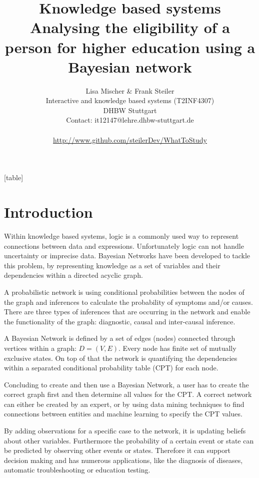 \documentclass[%
	pdftex,
	oneside,        %
	11pt,           %
	parskip=half,   %
	headsepline,    %
	footsepline,    %
	abstracton,     %
	USenglish,      %
	a4paper,        %
]{report}
\title{Knowledge based systems\\ Analysing the eligibility of a person for higher education using a Bayesian network}
\author{Lisa Mischer \& Frank Steiler\\ Interactive and knowledge based systems (T2INF4307)\\ DHBW Stuttgart\\ Contact: it12147@lehre.dhbw-stuttgart.de\\\\ \url{http://www.github.com/steilerDev/WhatToStudy}}
\begin{document}

[table]

\maketitle

\newpage
\thispagestyle{empty}
\mbox{}
\setcounter{page}{0}

\tableofcontents

\chapter{Introduction}
Within knowledge based systems, logic is a commonly used way to represent connections between data and expressions. Unfortunately logic can not handle uncertainty or imprecise data. Bayesian Networks have been developed to tackle this problem, by representing knowledge as a set of variables and their dependencies within a directed acyclic graph. \cite{Reichardt:2014aa}

A probabilistic network is using conditional probabilities between the nodes of the graph and inferences to calculate the probability of symptoms and/or causes. There are three types of inferences that are occurring in the network and enable the functionality of the graph: diagnostic, causal and inter-causal inference.

A Bayesian Network is defined by a set of edges (nodes) connected through vertices within a graph: $D=(V,E)$. Every node has finite set of mutually exclusive states. On top of that the network is quantifying the dependencies within a separated conditional probability table (CPT) for each node. \cite{Vomlel:2005aa}

Concluding to create and then use a Bayesian Network, a user has to create the correct graph first and then determine all values for the CPT. A correct network can either be created by an expert, or by using data mining techniques to find connections between entities and machine learning to specify the CPT values. 

By adding observations for a specific case to the network, it is updating beliefs about other variables. Furthermore the probability of a certain event or state can be predicted by observing other events or states. Therefore it can support decision making and has numerous applications, like the diagnosis of diseases, automatic troubleshooting or education testing. \cite{Vomlel:2005aa}
\end{document}
